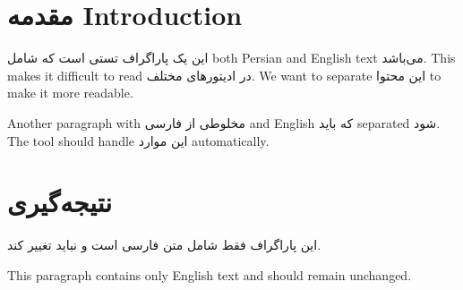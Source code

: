 \documentclass{article}
\begin{document}
\section{مقدمه Introduction}

این یک پاراگراف تستی است که شامل both Persian and English text می‌باشد. This makes it difficult to read در ادیتورهای مختلف. We want to separate این محتوا to make it more readable.

Another paragraph with مخلوطی از فارسی and English که باید separated شود. The tool should handle این موارد automatically.

\section{نتیجه‌گیری}

این پاراگراف فقط شامل متن فارسی است و نباید تغییر کند.

This paragraph contains only English text and should remain unchanged.
\end{document}
